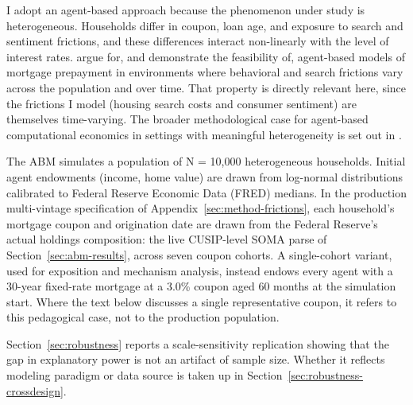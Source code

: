 \documentclass[12pt]{article}
\begin{document}
I adopt an agent-based approach because the phenomenon under study is heterogeneous. Households differ in coupon, loan age, and exposure to search and sentiment frictions, and these differences interact non-linearly with the level of interest rates. \citet{geanakoplos2012} argue for, and demonstrate the feasibility of, agent-based models of mortgage prepayment in environments where behavioral and search frictions vary across the population and over time. That property is directly relevant here, since the frictions I model (housing search costs and consumer sentiment) are themselves time-varying. The broader methodological case for agent-based computational economics in settings with meaningful heterogeneity is set out in \citet{tesfatsion2006}.

The ABM simulates a population of N = 10,000 heterogeneous households. Initial agent endowments (income, home value) are drawn from log-normal distributions calibrated to Federal Reserve Economic Data (FRED) medians. In the production multi-vintage specification of Appendix~\ref{sec:method-frictions}, each household's mortgage coupon and origination date are drawn from the Federal Reserve's actual holdings composition: the live CUSIP-level SOMA parse of Section~\ref{sec:abm-results}, across seven coupon cohorts. A single-cohort variant, used for exposition and mechanism analysis, instead endows every agent with a 30-year fixed-rate mortgage at a 3.0\% coupon aged 60 months at the simulation start. Where the text below discusses a single representative coupon, it refers to this pedagogical case, not to the production population.

Section~\ref{sec:robustness} reports a scale-sensitivity replication showing that the gap in explanatory power is not an artifact of sample size. Whether it reflects modeling paradigm or data source is taken up in Section~\ref{sec:robustness-crossdesign}.
\end{document}
